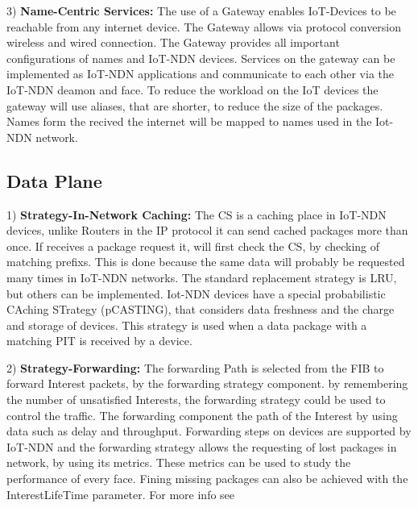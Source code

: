 \documentclass[conference]{IEEEtran}
\begin{document}
3) \textbf{Name-Centric Services:}
The use of a Gateway enables IoT-Devices to be reachable from any internet device. 
The Gateway allows via protocol conversion wireless and wired connection. %
The Gateway provides all important configurations of names and  IoT-NDN devices. Services on the gateway can be implemented as IoT-NDN applications and communicate to each other via the IoT-NDN deamon and face. %
To reduce the workload on the IoT devices the gateway will use aliases, that are shorter, to reduce the size  of the packages.
Names form the recived  the internet will be mapped to names used in the Iot-NDN network.

\subsection{Data Plane}
1) \textbf{Strategy-In-Network Caching:} 
The CS is a caching place in IoT-NDN devices, unlike Routers in the IP protocol it can send cached packages more than once.
If receives a package request it, will first check the CS, by checking of matching prefixs. %
This is done because the same data will probably be requested many times in IoT-NDN networks.
The standard replacement strategy is LRU, but others can be implemented. %
Iot-NDN devices have a special probabilistic CAching STrategy (pCASTING), that considers data freshness and the charge and storage of devices. This strategy is used %
when a data package with a matching PIT is received by a device.

2) \textbf{Strategy-Forwarding:}
The forwarding Path is selected from the FIB to forward Interest packets, by the forwarding strategy component. %
by remembering the number of unsatisfied Interests, the forwarding strategy could be used to control the traffic. %
The forwarding component the path of the Interest by using data such as delay and throughput. %
Forwarding steps on devices are supported by IoT-NDN and the forwarding strategy allows the requesting of lost packages in network, by using its metrics. %
These metrics can be used to study the performance of every face.
Fining missing packages can also be achieved with the InterestLifeTime parameter. For more info see \cite{b6}
\end{document}
